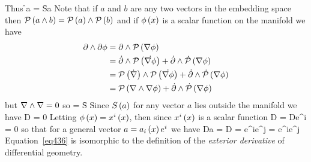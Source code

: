 Thus
\be
 \dot{\partial}\W\f{\dot{\prj}}{a} = \f{S}{a}
\ee
Note that if $a$ and $b$ are any two vectors in the embedding space then ${\mathcal{P}}\left ( {a\wedge b} \right )={\mathcal{P}}\left ( {a} \right )\wedge{\mathcal{P}}\left ( {b} \right )$ and if ${\phi}\left ( {x} \right )$ is a scalar function on the
manifold we have
\begin{align}
 \partial\wedge\partial\phi &= \partial\wedge{\mathcal{P}}\left ( {\nabla\phi} \right ) \nonumber \\
                        &= \dot{\partial}\wedge{\mathcal{P}}\left ( {\dot{\nabla\phi}} \right ) + \dot{\partial}\wedge{\dot{\mathcal{P}}}\left ( {\nabla\phi} \right ) \nonumber \\
                        &= {\mathcal{P}}\left ( {\dot{\nabla}} \right )\wedge{\mathcal{P}}\left ( {\dot{\nabla\phi}} \right ) + \dot{\partial}\wedge{\dot{\mathcal{P}}}\left ( {\nabla\phi} \right ) \nonumber \\
                        &= {\mathcal{P}}\left ( {\nabla\wedge\nabla\phi} \right )+ \dot{\partial}\wedge{\dot{\mathcal{P}}}\left ( {\nabla\phi} \right )
\end{align}
but $\nabla\wedge\nabla = 0$ so
\be
 \partial\W\partial\phi = \f{S}{\nabla\phi}
\ee
Since ${S}\left ( {a} \right )$ for any vector $a$ lies outside the manifold we have
\be
 D\W{} = 0
\ee
Letting ${\phi}\left ( {x} \right ) = {x^{i}}\left ( {x} \right )$, then since ${x^{i}}\left ( {x} \right )$ is a scalar function
\be\label{eq438a}
D\W{} = D\W e^{i} = 0
\ee
so that for a general vector $a = {a_{i}}\left ( {x} \right ) e^{i}$ we have
\be\label{eq436}
 D\W a = D\W{} = e^{i}\W e^{j} = \half e^{i}\W e^{j}
\ee
Equation~\ref{eq436} is isomorphic to the definition of the {\em exterior derivative} of differential geometry.
